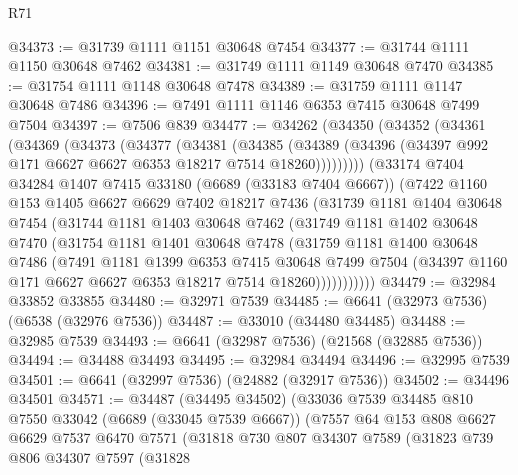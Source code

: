 \begin{lexlean}{R71}
\begin{coremodule}
@34373 := @31739 @1111 @1151 @30648 @7454
@34377 := @31744 @1111 @1150 @30648 @7462
@34381 := @31749 @1111 @1149 @30648 @7470
@34385 := @31754 @1111 @1148 @30648 @7478
@34389 := @31759 @1111 @1147 @30648 @7486
@34396 := @7491 @1111 @1146 @6353 @7415 @30648 @7499 @7504
@34397 := @7506 @839
@34477 := @34262
    (@34350
      (@34352
        (@34361
          (@34369
            (@34373
              (@34377
                (@34381
                  (@34385
                    (@34389 (@34396 (@34397 @992 @171 @6627 @6627 @6353 @18217 @7514 @18260)))))))))
        (@33174
          @7404
          @34284
          @1407
          @7415
          @33180
          (@6689 (@33183 @7404 @6667))
          (@7422
            @1160
            @153
            @1405
            @6627
            @6629
            @7402
            @18217
            @7436
            (@31739
              @1181
              @1404
              @30648
              @7454
              (@31744
                @1181
                @1403
                @30648
                @7462
                (@31749
                  @1181
                  @1402
                  @30648
                  @7470
                  (@31754
                    @1181
                    @1401
                    @30648
                    @7478
                    (@31759
                      @1181
                      @1400
                      @30648
                      @7486
                      (@7491
                        @1181
                        @1399
                        @6353
                        @7415
                        @30648
                        @7499
                        @7504
                        (@34397 @1160 @171 @6627 @6627 @6353 @18217 @7514 @18260)))))))))))
@34479 := @32984 @33852 @33855
@34480 := @32971 @7539
@34485 := @6641 (@32973 @7536) (@6538 (@32976 @7536))
@34487 := @33010 (@34480 @34485)
@34488 := @32985 @7539
@34493 := @6641 (@32987 @7536) (@21568 (@32885 @7536))
@34494 := @34488 @34493
@34495 := @32984 @34494
@34496 := @32995 @7539
@34501 := @6641 (@32997 @7536) (@24882 (@32917 @7536))
@34502 := @34496 @34501
@34571 := @34487
    (@34495 @34502)
    (@33036
      @7539
      @34485
      @810
      @7550
      @33042
      (@6689 (@33045 @7539 @6667))
      (@7557
        @64
        @153
        @808
        @6627
        @6629
        @7537
        @6470
        @7571
        (@31818
          @730
          @807
          @34307
          @7589
          (@31823
            @739
            @806
            @34307
            @7597
            (@31828

\end{coremodule}
\end{lexlean}
